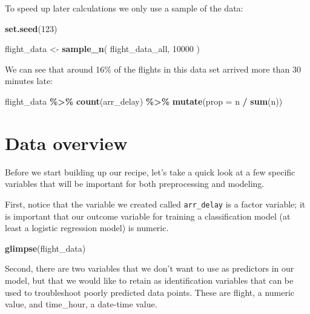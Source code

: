 \documentclass[
]{book}
\newenvironment{Shaded}{\begin{snugshade}}{\end{snugshade}}
\newcommand{\DataTypeTok}[1]{\textcolor[rgb]{0.13,0.29,0.53}{#1}}
\newcommand{\DecValTok}[1]{\textcolor[rgb]{0.00,0.00,0.81}{#1}}
\newcommand{\KeywordTok}[1]{\textcolor[rgb]{0.13,0.29,0.53}{\textbf{#1}}}
\newcommand{\NormalTok}[1]{#1}
\newcommand{\OperatorTok}[1]{\textcolor[rgb]{0.81,0.36,0.00}{\textbf{#1}}}
\newcommand{\StringTok}[1]{\textcolor[rgb]{0.31,0.60,0.02}{#1}}
\begin{document}
To speed up later calculations we only use a sample of the data:

\begin{Shaded}
\begin{Highlighting}[]
\KeywordTok{set.seed}\NormalTok{(}\DecValTok{123}\NormalTok{)}

\NormalTok{flight\_data \textless{}{-}}\StringTok{ }\KeywordTok{sample\_n}\NormalTok{(}
\NormalTok{  flight\_data\_all,}
  \DecValTok{10000}
\NormalTok{)}
\end{Highlighting}
\end{Shaded}

We can see that around 16\% of the flights in this data set arrived more than 30 minutes late:

\begin{Shaded}
\begin{Highlighting}[]
\NormalTok{flight\_data }\OperatorTok{\%\textgreater{}\%}
\StringTok{  }\KeywordTok{count}\NormalTok{(arr\_delay) }\OperatorTok{\%\textgreater{}\%}
\StringTok{  }\KeywordTok{mutate}\NormalTok{(}\DataTypeTok{prop =}\NormalTok{ n }\OperatorTok{/}\StringTok{ }\KeywordTok{sum}\NormalTok{(n))}
\end{Highlighting}
\end{Shaded}

\hypertarget{data-overview-1}{%
\section{Data overview}\label{data-overview-1}}

Before we start building up our recipe, let's take a quick look at a few specific variables that will be important for both preprocessing and modeling.

First, notice that the variable we created called \texttt{arr\_delay} is a factor variable; it is important that our outcome variable for training a classification model (at least a logistic regression model) is numeric.

\begin{Shaded}
\begin{Highlighting}[]
\KeywordTok{glimpse}\NormalTok{(flight\_data)}
\end{Highlighting}
\end{Shaded}

Second, there are two variables that we don't want to use as predictors in our model, but that we would like to retain as identification variables that can be used to troubleshoot poorly predicted data points. These are flight, a numeric value, and time\_hour, a date-time value.
\end{document}
